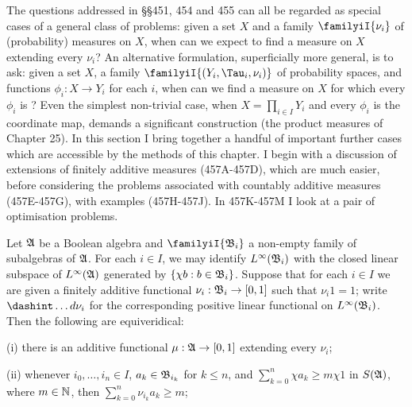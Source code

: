 
\def\chaptername{Perfect measures, disintegrations and processes}
\def\sectionname{Simultaneous extension of measures}


The questions addressed in \S\S451, 454 and 455 can all be regarded as
special cases of a general class of problems:  given a set $X$ and a
family $\familyiI{\nu_i}$ of (probability) measures on $X$, when can we
expect to find a measure on $X$ extending every $\nu_i$?   An
alternative formulation, superficially more general, is to ask:  given a
set $X$, a family $\familyiI{(Y_i,\Tau_i,\nu_i)}$ of probability spaces,
and functions $\phi_i:X\to Y_i$ for each $i$, when can we find a measure
on $X$ for which every $\phi_i$ is \imp?   Even the simplest non-trivial
case, when $X=\prod_{i\in I}Y_i$ and every $\phi_i$ is the coordinate
map, demands a significant construction (the product measures of Chapter
25).   In this section I bring together a handful of important further
cases which are accessible by the methods of this chapter.   I begin
with a discussion of extensions of finitely additive measures
(457A-457D), which are much easier, before considering the problems
associated with countably additive measures (457E-457G), with examples
(457H-457J).   In 457K-457M %
I look at a pair of optimisation problems.

 Let $\frak A$ be a Boolean algebra and
$\familyiI{\frak B_i}$ a non-empty family of subalgebras of $\frak A$.
For each $i\in I$, we may identify $L^{\infty}(\frak B_i)$ with the
closed linear subspace of $L^{\infty}(\frak A)$ generated by
$\{\chi b:b\in\frak B_i\}$.
Suppose that for each $i\in I$ we are given a finitely additive
functional $\nu_i:\frak B_i\to[0,1]$ such that $\nu_i1=1$;  write
$\dashint\ldots d\nu_i$ for the
corresponding positive linear functional on
$L^{\infty}(\frak B_i)$.   Then the following
are equiveridical:

\quad(i) there is an additive functional $\mu:\frak A\to[0,1]$ extending
every $\nu_i$;

\quad(ii) whenever $i_0,\ldots,i_n\in I$, $a_k\in\frak B_{i_k}$ for
$k\le n$, and $\sum_{k=0}^n\chi a_k\ge m\chi 1$ in $S(\frak A)$, where
$m\in\Bbb N$, then $\sum_{k=0}^n\nu_{i_k}a_k\ge m$;

